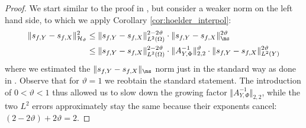 \documentclass[a4paper, 10pt]{article}
\newcommand{\Ht}{\mathcal{H}_{\vartheta}}
\begin{document}
\begin{proof}
We start similar to the proof in \cite{schaback2002inverse}, but consider a weaker norm on the left hand side, to which we apply Corollary \ref{cor:hoelder_interpol}:
\begin{align*}
\Vert s_{f, Y} - s_{f, X} \Vert_{\Ht}^2 &\leq \Vert s_{f, Y} - s_{f, X} \Vert_{L^2(\Omega)}^{2 - 2\vartheta} \cdot \Vert s_{f, Y} - s_{f, X} \Vert_{\ns}^{2\vartheta} \\
&\leq \Vert s_{f, Y} - s_{f, X} \Vert_{L^2(\Omega)}^{2 - 2\vartheta} \cdot \Vert A_{Y, \Phi}^{-1} \Vert_{2,2}^{\vartheta} \cdot \Vert s_{f, Y} - s_{f, X} \Vert_{L^2(Y)}^{2\vartheta}
\end{align*}
where we estimated the $\Vert s_{f, Y} - s_{f, X} \Vert_{\ns}$ norm just in the standard way as done in \cite{schaback2002inverse}.
Observe that for $\vartheta = 1$ we reobtain the standard statement.
The introduction of $0 < \vartheta < 1$ thus allowed us to slow down the growing factor $\Vert A_{Y, \Phi}^{-1} \Vert_{2,2}$,
while the two $L^2$ errors approximately stay the same because their exponents cancel: $(2 - 2\vartheta) + 2\vartheta = 2$.


\end{proof}
\end{document}
